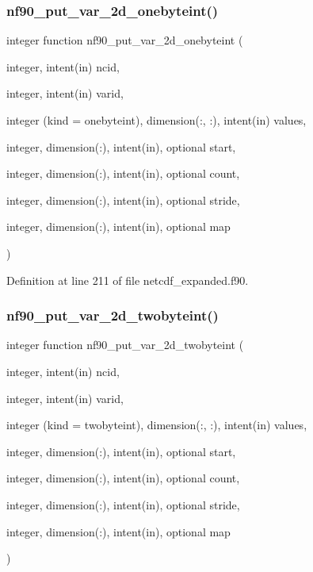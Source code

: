 \subsubsection{\texorpdfstring{nf90\+\_\+put\+\_\+var\+\_\+2d\+\_\+onebyteint()}{nf90\_put\_var\_2d\_onebyteint()}}
{\footnotesize\ttfamily integer function nf90\+\_\+put\+\_\+var\+\_\+2d\+\_\+onebyteint (\begin{DoxyParamCaption}\item[{integer, intent(in)}]{ncid,  }\item[{integer, intent(in)}]{varid,  }\item[{integer (kind = onebyteint), dimension(\+:, \+:), intent(in)}]{values,  }\item[{integer, dimension(\+:), intent(in), optional}]{start,  }\item[{integer, dimension(\+:), intent(in), optional}]{count,  }\item[{integer, dimension(\+:), intent(in), optional}]{stride,  }\item[{integer, dimension(\+:), intent(in), optional}]{map }\end{DoxyParamCaption})}



Definition at line 211 of file netcdf\+\_\+expanded.\+f90.

\mbox{\label{netcdf__expanded_8f90_a1c5a0292a649ce8d1272ea15bf09f1ae}} 
\subsubsection{\texorpdfstring{nf90\+\_\+put\+\_\+var\+\_\+2d\+\_\+twobyteint()}{nf90\_put\_var\_2d\_twobyteint()}}
{\footnotesize\ttfamily integer function nf90\+\_\+put\+\_\+var\+\_\+2d\+\_\+twobyteint (\begin{DoxyParamCaption}\item[{integer, intent(in)}]{ncid,  }\item[{integer, intent(in)}]{varid,  }\item[{integer (kind = twobyteint), dimension(\+:, \+:), intent(in)}]{values,  }\item[{integer, dimension(\+:), intent(in), optional}]{start,  }\item[{integer, dimension(\+:), intent(in), optional}]{count,  }\item[{integer, dimension(\+:), intent(in), optional}]{stride,  }\item[{integer, dimension(\+:), intent(in), optional}]{map }\end{DoxyParamCaption})}



